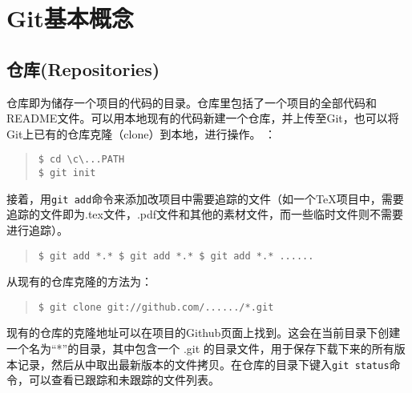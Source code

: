 \documentclass{article}
\begin{document}
	\section{Git基本概念} %
	\label{sec:git基本概念}
		\subsection{仓库(Repositories)}
		仓库即为储存一个项目的代码的目录。仓库里包括了一个项目的全部代码和README文件。可以用本地现有的代码新建一个仓库，并上传至Git，也可以将Git上已有的仓库克隆（clone）到本地，进行操作。
		：
			\begin{quote}
				\begin{lstlisting}
$ cd \c\...PATH
$ git init
				\end{lstlisting}
			\end{quote}
		\par 接着，用{\tt git add}命令来添加改项目中需要追踪的文件（如一个TeX项目中，需要追踪的文件即为.tex文件，.pdf文件和其他的素材文件，而一些临时文件则不需要进行追踪）。
			\begin{quote}
				\begin{lstlisting}
$ git add *.* $ git add *.* $ git add *.* ......
				\end{lstlisting}
			\end{quote}
		\par 从现有的仓库克隆的方法为：
			\begin{quote}
				\begin{lstlisting}
$ git clone git://github.com/....../*.git
				\end{lstlisting}
			\end{quote}
		\par 现有的仓库的克隆地址可以在项目的Github页面上找到。这会在当前目录下创建一个名为“*”的目录，其中包含一个 .git 的目录文件，用于保存下载下来的所有版本记录，然后从中取出最新版本的文件拷贝。在仓库的目录下键入{\tt git status}命令，可以查看已跟踪和未跟踪的文件列表。

\end{document}
